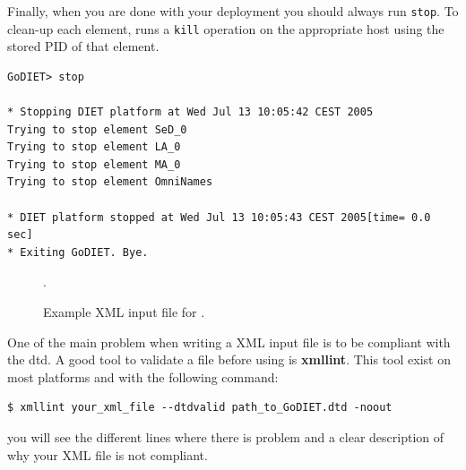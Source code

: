 Finally, when you are done with your \diet deployment you should always run
\texttt{stop}. To clean-up each element, \godiet runs a \texttt{kill} operation
on the appropriate host using the stored PID of that element.

\begin{verbatim}
GoDIET> stop

* Stopping DIET platform at Wed Jul 13 10:05:42 CEST 2005
Trying to stop element SeD_0
Trying to stop element LA_0
Trying to stop element MA_0
Trying to stop element OmniNames

* DIET platform stopped at Wed Jul 13 10:05:43 CEST 2005[time= 0.0 sec]
* Exiting GoDIET. Bye.
\end{verbatim}

\begin{figure}[p]
.
\caption{Example XML input file for \godiet.\label{fig:godietXml}}
\end{figure}

One of the main problem when writing a \godiet XML input file is to be compliant
with the dtd. A good tool to validate a \godiet file before using \godiet is
\textbf{xmllint}. This tool exist on most platforms and with the following
command:
\begin{verbatim}
$ xmllint your_xml_file --dtdvalid path_to_GoDIET.dtd -noout
\end{verbatim}
you will see the different lines where there is problem and a clear description
of why your XML file is not compliant.

\clearpage
